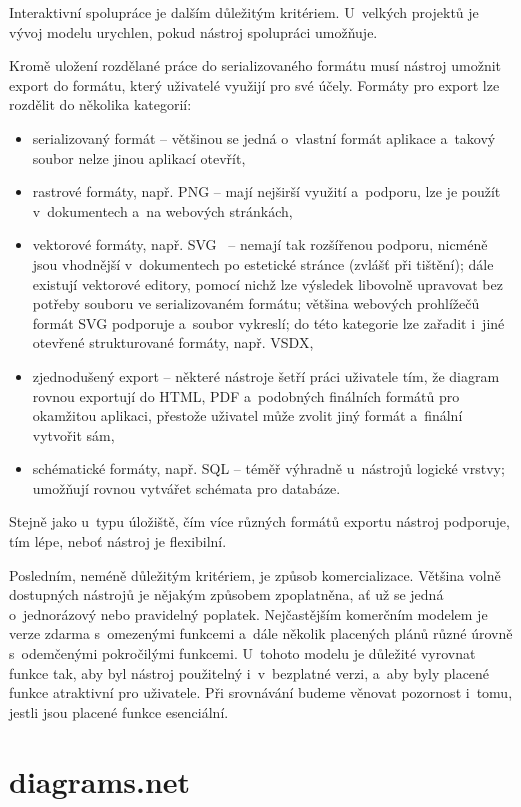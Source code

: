 Interaktivní spolupráce je dalším důležitým kritériem. U~velkých projektů je
vývoj modelu urychlen, pokud nástroj spolupráci umožňuje.

Kromě uložení rozdělané práce do serializovaného formátu musí nástroj umožnit
export do formátu, který uživatelé využijí pro své účely. Formáty pro export lze
rozdělit do několika kategorií:
\begin{itemize}
  \item serializovaný formát -- většinou se jedná o~vlastní formát aplikace
a~takový soubor nelze jinou aplikací otevřít,
  \item rastrové formáty, např. PNG -- mají nejširší využití a~podporu, lze je
  použít v~dokumentech a~na webových stránkách,
  \item vektorové formáty, např. SVG~\cite{Dirk18} -- nemají tak
  rozšířenou podporu, nicméně jsou vhodnější v~dokumentech po estetické stránce
  (zvlášť při tištění); dále existují vektorové editory, pomocí nichž lze
  výsledek libovolně upravovat bez potřeby souboru ve serializovaném formátu;
  většina webových prohlížečů formát SVG podporuje a~soubor vykreslí; do této
  kategorie lze zařadit i~jiné otevřené strukturované formáty, např. VSDX,
  \item zjednodušený export -- některé nástroje šetří práci uživatele tím, že
  diagram rovnou exportují do HTML, PDF a~podobných finálních formátů pro
  okamžitou aplikaci, přestože uživatel může zvolit jiný formát a~finální
  vytvořit sám,
  \item schématické formáty, např. SQL -- téměř výhradně u~nástrojů logické
  vrstvy; umožňují rovnou vytvářet schémata pro databáze.
\end{itemize}

Stejně jako u~typu úložiště, čím více různých formátů exportu nástroj podporuje,
tím lépe, neboť nástroj je flexibilní.

Posledním, neméně důležitým kritériem, je způsob komercializace. Většina volně
dostupných nástrojů je nějakým způsobem zpoplatněna, ať už se jedná
o~jednorázový nebo pravidelný poplatek. Nejčastějším komerčním modelem je verze
zdarma s~omezenými funkcemi a~dále několik placených plánů různé úrovně
s~odemčenými pokročilými funkcemi. U~tohoto modelu je důležité vyrovnat funkce
tak, aby byl nástroj použitelný i~v~bezplatné verzi, a~aby byly placené funkce
atraktivní pro uživatele. Při srovnávání budeme věnovat pozornost i~tomu, jestli
jsou placené funkce esenciální.

\section{diagrams.net}

